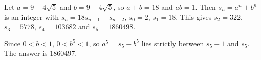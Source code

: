 Let $a=9+4\sqrt5$ and $b=9-4\sqrt5$, so $a+b=18$ and $ab=1$. Then $s_n=a^n+b^n$ is an integer with $s_n=18s_{n-1}-s_{n-2}$, $s_0=2$, $s_1=18$. This gives $s_2=322$, $s_3=5778$, $s_4=103682$ and $s_5=1860498$.

Since $0<b<1$, $0<b^5<1$, so $a^5=s_5-b^5$ lies strictly between $s_5-1$ and $s_5$. The answer is $\boxed{1860497}$.
